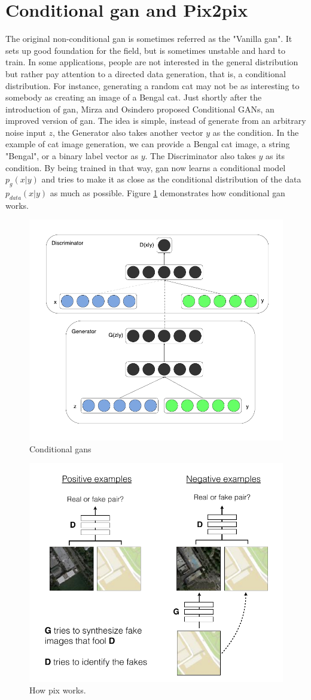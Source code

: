 \section{Conditional \acrshort{gan} and Pix2pix}
The original non-conditional \acrshort{gan} is sometimes referred as the "Vanilla
\acrshort{gan}". It sets up good foundation for the field, but is sometimes unstable and
hard to train. In some applications, people are not interested in the general distribution
but rather pay attention to a directed data generation, that is, a conditional
distribution. For instance, generating a random cat may not be as interesting to somebody
as creating an image of a Bengal cat. Just shortly after the introduction of
\acrshort{gan}, Mirza and Osindero \cite{cogan} proposed Conditional GANs, an improved
version of \acrshort{gan}. The idea is simple, instead of generate from an arbitrary noise
input $z$, the Generator also takes another vector $y$ as the condition. In the example of
cat image generation, we can provide a Bengal cat image, a string "Bengal", or a binary
label vector as $y$. The Discriminator also takes $y$ as its condition. By being trained
in that way, \acrshort{gan} now learns a conditional model $p_{g}(x|y)$ and tries to make
it as close as the conditional distribution of the data $p_{data}(x|y)$ as much as
possible. Figure \ref{fig:co_gan_model} demonstrates how conditional \acrshort{gan} works.

\begin{figure}[h]
	\centering
	\includegraphics[width=0.5\linewidth]{img/co_gan_model}
	\caption{Conditional \acrshort{gan}s}
	\label{fig:co_gan_model}
\end{figure}

\begin{figure}[h]
	\centering
	\includegraphics[width=0.5\linewidth]{img/pix2pix_workflow}
	\caption{How \acrshort{pix} works.}
	\label{fig:pix2pix_workflow}
\end{figure}

